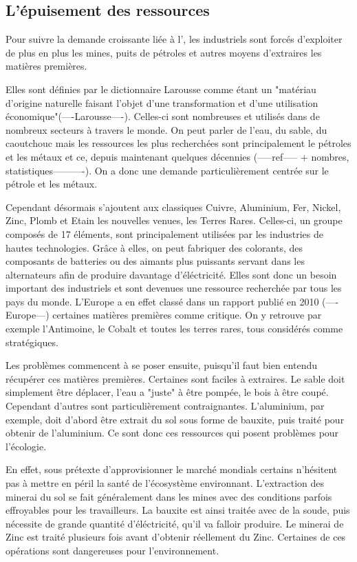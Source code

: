 \subsection{L’épuisement des ressources}

Pour suivre la demande croissante liée à l'\op, les industriels sont forcés d'exploiter de plus en plus les mines, puits de pétroles et autres moyens d'extraires les matières premières.

\smallbreak Elles sont définies par le dictionnaire Larousse comme étant un "matériau d'origine naturelle faisant l'objet d'une transformation et d'une utilisation économique"(----Larousse----). Celles-ci sont nombreuses et utilisés dans de nombreux secteurs à travers le monde. On peut parler de l'eau, du sable, du caoutchouc mais les ressources les plus recherchées sont principalement le pétroles et les métaux et ce, depuis maintenant quelques décennies (-----ref----- + nombres, statistiques----------). On a donc une demande particulièrement centrée sur le pétrole et les métaux.

Cependant désormais s'ajoutent aux classiques Cuivre, Aluminium, Fer, Nickel, Zinc, Plomb et Etain les nouvelles venues, les Terres Rares. Celles-ci, un groupe composés de 17 éléments, sont principalement utilisées par les industries de hautes technologies. Grâce à elles, on peut fabriquer des colorants, des composants de batteries ou des aimants plus puissants servant dans les alternateurs afin de produire davantage d'éléctricité. Elles sont donc un besoin important des industriels et sont devenues une ressource recherchée par tous les pays du monde. L'Europe a en effet classé dans un rapport publié en 2010 (----Europe---) certaines matières premières comme critique. On y retrouve par exemple l'Antimoine, le Cobalt et toutes les terres rares, tous considérés comme stratégiques.


\smallbreak Les problèmes commencent à se poser ensuite, puisqu'il faut bien entendu récupérer ces matières premières. Certaines sont faciles à extraires. Le sable doit simplement être déplacer, l'eau a "juste" à être pompée, le bois à être coupé. Cependant d'autres sont particulièrement contraignantes. L'aluminium, par exemple, doit d'abord être extrait du sol sous forme de bauxite, puis traité pour obtenir de l'aluminium. Ce sont donc ces ressources qui posent problèmes pour l'écologie.

En effet, sous prétexte d'approvisionner le marché mondials certains n'hésitent pas à mettre en péril la santé de l'écosystème environnant. L'extraction des minerai du sol se fait généralement dans les mines avec des conditions parfois effroyables pour les travailleurs. La bauxite est ainsi traitée avec de la soude, puis nécessite de grande quantité d'éléctricité, qu'il va falloir produire. Le minerai de Zinc est traité plusieurs fois avant d'obtenir réellement du Zinc. Certaines de ces opérations sont dangereuses pour l'environnement.

